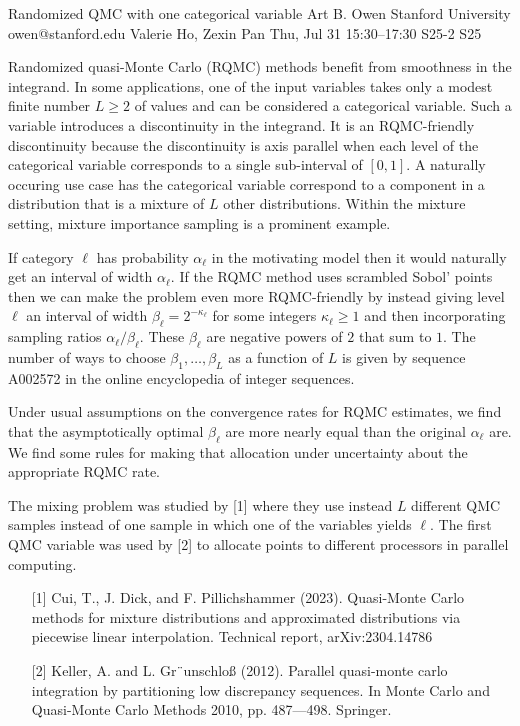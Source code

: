 \begin{talk}
  {Randomized QMC with one categorical variable}%
  {Art B. Owen}%
  {Stanford University}%
  {owen@stanford.edu}%
  {Valerie Ho, Zexin Pan}%
  {}%
  {Thu, Jul 31 15:30–17:30}%
  {S25-2}%
  {S25}%
  
				
			
  Randomized quasi-Monte Carlo (RQMC) methods benefit from smoothness
  in the integrand.  In some applications, one of the input variables takes
  only a modest finite number $L\geqslant2$
of values and can be considered a categorical
  variable. Such a variable introduces a discontinuity in the integrand.  It is
  an RQMC-friendly discontinuity because the discontinuity is axis parallel
  when each level of the categorical variable corresponds to a single
  sub-interval of $[0,1]$.  A naturally occuring use case has
  the categorical variable correspond to a component in a distribution
  that is a mixture of $L$ other distributions.  Within the mixture
  setting, mixture importance sampling is a prominent example.

 If category $\ell$  has probability $\alpha_\ell$ in the motivating
  model then it would naturally get an interval of width $\alpha_\ell$.
If the RQMC method uses scrambled Sobol' points
then we can make the problem even more RQMC-friendly by instead giving
  level $\ell$ an interval of width $\beta_\ell = 2^{-\kappa_\ell}$
  for some integers $\kappa_\ell \geqslant1$ and then
  incorporating sampling ratios $\alpha_\ell/\beta_\ell$.
  These $\beta_\ell$ are negative powers of $2$ that sum to $1$.
  The number of ways to choose $\beta_1,\dots,\beta_L$
  as a function of $L$ is given by sequence A002572 in the
  online encyclopedia of integer sequences.

  Under usual assumptions on the convergence rates for RQMC
  estimates, we find that the asymptotically optimal $\beta_\ell$
  are more nearly equal than the original $\alpha_\ell$ are.
  We find some rules for making that  allocation under uncertainty
  about the appropriate RQMC rate.

  The mixing problem was studied by [1] where they use instead
  $L$ different QMC samples instead of one sample in which
  one of the variables yields $\ell$. The first QMC variable
  was used by [2] to allocate points to different processors
  in parallel computing.

\medskip
\begin{enumerate}
	\item[{[1]}] Cui, T., J. Dick, and F. Pillichshammer (2023). Quasi-Monte Carlo methods
for mixture distributions and approximated distributions via piecewise linear
interpolation. Technical report, arXiv:2304.14786 
\item[{[2]}]
Keller, A. and L. Gr¨unschloß (2012). Parallel quasi-monte carlo integration by
partitioning low discrepancy sequences. In Monte Carlo and Quasi-Monte
Carlo Methods 2010, pp. 487---498. Springer.
\end{enumerate}

\end{talk}

